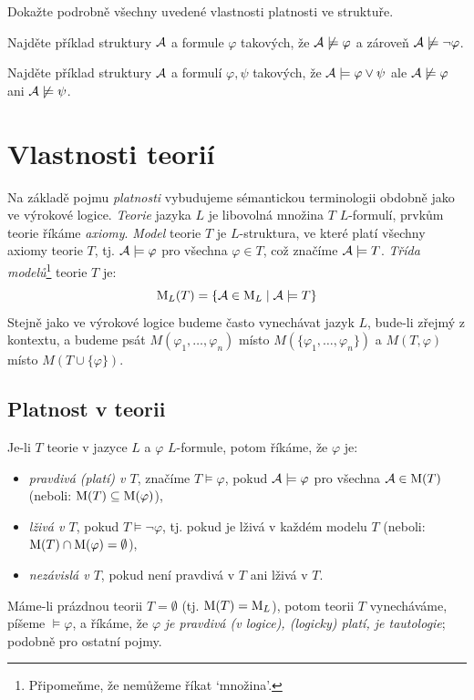 \begin{exercise}
    Dokažte podrobně všechny uvedené vlastnosti platnosti ve struktuře.
\end{exercise}

\begin{exercise}
    Najděte příklad struktury $\mathcal{A}$ a formule $\varphi$ takových, že $\mathcal{A}\not\models\varphi$ a zároveň $\mathcal{A}\not\models\neg\varphi$.
\end{exercise}

\begin{exercise}
    Najděte příklad struktury $\mathcal{A}$ a formulí $\varphi,\psi$ takových, že $\mathcal{A}\models\varphi\lor\psi$ ale $\mathcal{A}\not\models\varphi$ ani $\mathcal{A}\not\models\psi$.
\end{exercise}

\section{Vlastnosti teorií}

Na základě pojmu \emph{platnosti} vybudujeme sémantickou terminologii obdobně jako ve výrokové logice. \emph{Teorie} jazyka $L$ je libovolná množina $T$ $L$-formulí, prvkům teorie říkáme \emph{axiomy}. \emph{Model} teorie $T$ je $L$-struktura, ve které platí všechny axiomy teorie $T$, tj. $\mathcal{A}\models\varphi$ pro všechna $\varphi\in T$, což značíme $\mathcal{A}\models T$. \emph{Třída modelů}\footnote{Připomeňme, že nemůžeme říkat `množina'.} teorie $T$ je:
$$
\operatorname{M}_L(T)=\{\mathcal{A}\in\operatorname{M}_L\mid\mathcal{A}\models T\}
$$
Stejně jako ve výrokové logice budeme často vynechávat jazyk $L$, bude-li zřejmý z kontextu, a budeme psát $M(\varphi_1,\dots,\varphi_n)$ místo $M(\{\varphi_1,\dots,\varphi_n\})$ a $M(T,\varphi)$ místo $M(T\cup\{\varphi\})$.

\subsection{Platnost v teorii}

Je-li $T$ teorie v jazyce $L$ a $\varphi$ $L$-formule, potom říkáme, že $\varphi$ je: 
\begin{itemize}
    \item \emph{pravdivá (platí) v $T$}, značíme $T\models\varphi$, pokud $\mathcal{A}\models\varphi$ pro všechna $\mathcal{A}\in\operatorname{M}(T)$ (neboli: $\operatorname{M}(T)\subseteq\operatorname{M}(\varphi)$),
    \item \emph{lživá v $T$}, pokud $T\models\neg\varphi$, tj. pokud je lživá v každém modelu $T$ (neboli: $\operatorname{M}(T)\cap\operatorname{M}(\varphi)=\emptyset$),
    \item \emph{nezávislá v $T$}, pokud není pravdivá v $T$ ani lživá v $T$.
\end{itemize}
Máme-li prázdnou teorii $T=\emptyset$ (tj. $\operatorname{M}(T)=\operatorname{M}_L$), potom teorii $T$ vynecháváme, píšeme $\models\varphi$, a říkáme, že $\varphi$ \emph{je pravdivá (v logice), (logicky) platí, je tautologie}; podobně pro ostatní pojmy.

